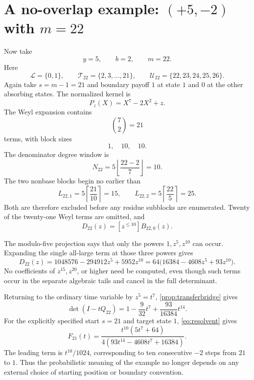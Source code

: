 \documentclass[11pt]{amsart}
\theoremstyle{remark}
\begin{document}
\section{A no-overlap example: \texorpdfstring{$(+5,-2)$}{(+5,-2)} with \texorpdfstring{$m=22$}{m=22}}\label{sec:example22}

Now take
\[
    y=5,
    \qquad b=2,
    \qquad m=22.
\]
Here
\[
    \mathcal L=\{0,1\},\qquad
    \mathcal T_{22}=\{2,3,\ldots,21\},\qquad
    \mathcal U_{22}=\{22,23,24,25,26\}.
\]
Again take $s=m-1=21$ and boundary payoff $1$ at state $1$ and $0$ at the other absorbing states.  The normalized kernel is
\[
    P_z(X)=X^7-2X^2+z.
\]
The Weyl expansion contains
\[
    \binom72=21
\]
terms, with block sizes
\[
    1,\quad10,\quad10.
\]
The denominator degree window is
\begin{equation}\label{eq:N22}
    N_{22}=5\left\lfloor\frac{22-2}{7}\right\rfloor=10.
\end{equation}
The two nonbase blocks begin no earlier than
\begin{equation}\label{eq:L22}
    L_{22,1}
    =5\left\lceil\frac{21}{10}\right\rceil=15,
    \qquad
    L_{22,2}
    =5\left\lceil\frac{22}{5}\right\rceil=25.
\end{equation}
Both are therefore excluded before any residue subblocks are enumerated.  Twenty of the twenty-one Weyl terms are omitted, and
\begin{equation}\label{eq:onlybase22}
    D_{22}(z)=[z^{\leq10}]B_{22,0}(z).
\end{equation}

The modulo-five projection says that only the powers $1,z^5,z^{10}$ can occur.  Expanding the single all-large term at those three powers gives
\begin{equation}\label{eq:D22}
    D_{22}(z)
    =1048576-294912z^5+5952z^{10}
    =64\bigl(16384-4608z^5+93z^{10}\bigr).
\end{equation}
No coefficients of $z^{15},z^{20}$, or higher need be computed, even though such terms occur in the separate algebraic tails and cancel in the full determinant.

Returning to the ordinary time variable by $z^5=t^7$, \cref{prop:transferbridge} gives
\begin{equation}\label{eq:transfer22}
    \det(I-tQ_{22})
    =1-\frac{9}{32}t^7+\frac{93}{16384}t^{14}.
\end{equation}
For the explicitly specified start $s=21$ and target state $1$, \eqref{eq:resolvent} gives
\begin{equation}\label{eq:F22physical}
    F_{21}(t)
    =\frac{t^{10}(5t^7+64)}
    {4(93t^{14}-4608t^7+16384)}.
\end{equation}
The leading term is $t^{10}/1024$, corresponding to ten consecutive $-2$ steps from $21$ to $1$.  Thus the probabilistic meaning of the example no longer depends on any external choice of starting position or boundary convention.
\end{document}
